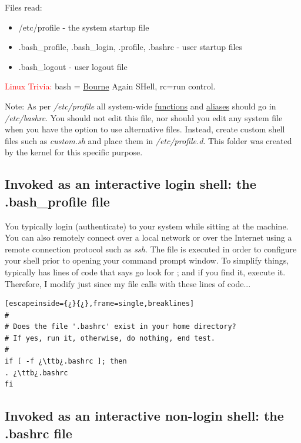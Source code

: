 Files read:

\begin{itemize}
	\item /etc/profile	- the system startup file
	\item \ttb{}.bash\_profile, \ttb{}.bash\_login, \ttb{}.profile, \ttb{}.bashrc - user startup files
	\item \ttb{}.bash\_logout - user logout file
\end{itemize}

\textcolor{red}{Linux Trivia:} bash = \href{https://en.wikipedia.org/wiki/Bourne_shell}{Bourne} Again SHell, rc=run control.

Note: As per \textsl{/etc/profile} all system-wide \hyperref[subsec:functions]{functions} and \hyperref[subsec:aliases]{aliases} should go in \textsl{/etc/bashrc}. You should not edit this file, nor should you edit any system file when you have the option to use alternative files. Instead, create custom shell files such as \textsl{custom.sh} and place them in \textsl{/etc/profile.d}. This folder was created by the kernel for this specific purpose.

\subsection{Invoked as an interactive login shell: the  \ttb{}.bash\_profile file}

You typically login (authenticate) to your system while sitting at the machine. You can also remotely connect over a local network or over the Internet using a remote connection protocol such as \emph{ssh}. The  file is executed in order to configure your shell prior to opening your command prompt window. To simplify things,  typically has lines of code that says go look for ; and if you find it, execute it. Therefore, I modify just  since my  file calls  with these lines of code...


\begin{lstlisting}[escapeinside={¿}{¿},frame=single,breaklines]
#
# Does the file '.bashrc' exist in your home directory?
# If yes, run it, otherwise, do nothing, end test.
#
if [ -f ¿\ttb¿.bashrc ]; then	
. ¿\ttb¿.bashrc
fi
\end{lstlisting}


\subsection{Invoked as an interactive non-login shell: the  \ttb{}.bashrc file}

